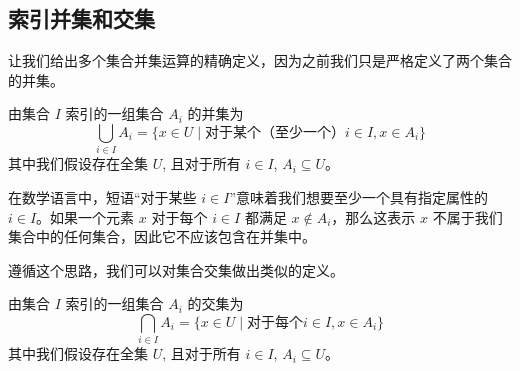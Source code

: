\subsection{索引并集和交集}\label{sec:section3.6.2}

让我们给出多个集合并集运算的精确定义，因为之前我们只是严格定义了两个集合的并集。

\begin{definition}\label{def:definition3.6.1}
    由集合 $I$ 索引的一组集合 $A_i$ 的并集为
    \[\bigcup_{i \in I} A_i = \{x \in U \mid \text{对于某个（至少一个）} i \in I, x \in A_i \}\]
    其中我们假设存在全集 $U$, 且对于所有 $i \in I$, $A_i \subseteq U$。
\end{definition}

在数学语言中，短语``对于某些 $i \in I$''意味着我们想要至少一个具有指定属性的 $i \in I$。如果一个元素 $x$ 对于每个 $i \in I$ 都满足 $x \notin A_i$，那么这表示 $x$ 不属于我们集合中的任何集合，因此它不应该包含在并集中。

遵循这个思路，我们可以对集合交集做出类似的定义。

\begin{definition}\label{def:definition3.6.2}
    由集合 $I$ 索引的一组集合 $A_i$ 的交集为
    \[\bigcap_{i \in I} A_i = \{x \in U \mid \text{对于每个} i \in I, x \in A_i \}\]
    其中我们假设存在全集 $U$, 且对于所有 $i \in I$, $A_i \subseteq U$。
\end{definition}
